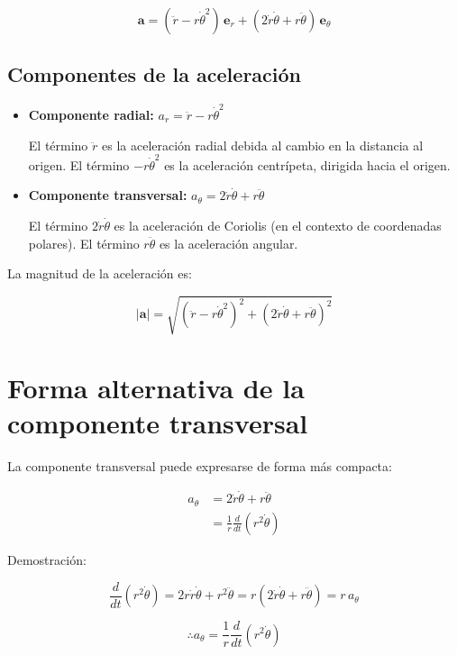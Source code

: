 \documentclass[12pt,a4paper]{article}
\begin{document}
\begin{equation}
    \boxed{\mathbf{a} = (\ddot{r} - r\dot{\theta}^2)\,\mathbf{e}_r
           + (2\dot{r}\dot{\theta} + r\ddot{\theta})\,\mathbf{e}_\theta}
    \label{eq:aceleracion}
\end{equation}

\subsection{Componentes de la aceleración}

\begin{itemize}
    \item \textbf{Componente radial:} $a_r = \ddot{r} - r\dot{\theta}^2$
    
    El término $\ddot{r}$ es la aceleración radial debida al cambio en la
    distancia al origen. El término $-r\dot{\theta}^2$ es la aceleración
    centrípeta, dirigida hacia el origen.
    
    \item \textbf{Componente transversal:} $a_\theta = 2\dot{r}\dot{\theta} + r\ddot{\theta}$
    
    El término $2\dot{r}\dot{\theta}$ es la aceleración de Coriolis (en el
    contexto de coordenadas polares). El término $r\ddot{\theta}$ es la
    aceleración angular.
\end{itemize}

La magnitud de la aceleración es:

\[
|\mathbf{a}| = \sqrt{(\ddot{r} - r\dot{\theta}^2)^2 + (2\dot{r}\dot{\theta} + r\ddot{\theta})^2}
\]

\section{Forma alternativa de la componente transversal}

La componente transversal puede expresarse de forma más compacta:

\begin{align*}
    a_\theta &= 2\dot{r}\dot{\theta} + r\ddot{\theta} \\
    &= \frac{1}{r}\frac{d}{dt}(r^2\dot{\theta})
\end{align*}

Demostración:

\[
\frac{d}{dt}(r^2\dot{\theta}) = 2r\dot{r}\dot{\theta} + r^2\ddot{\theta}
   = r(2\dot{r}\dot{\theta} + r\ddot{\theta}) = r\,a_\theta
\]

\[
\therefore a_\theta = \frac{1}{r}\frac{d}{dt}(r^2\dot{\theta})
\]
\end{document}
